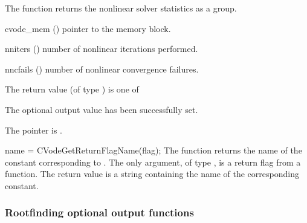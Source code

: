 {
  The function  returns the
  {\cvodes} nonlinear solver statistics as a group.
}
{
  \begin{args}
  \item[cvode\_mem] ()
    pointer to the {\cvodes} memory block.
  \item[nniters] ()
    number of nonlinear iterations performed.
  \item[nncfails] ()
    number of nonlinear convergence failures.
  \end{args}
}
{
  The return value  (of type ) is one of
  \begin{args}
  \item[\Id{CV\_SUCCESS}] 
    The optional output value has been successfully set.
  \item[\Id{CV\_MEM\_NULL}]
    The  pointer is .
  \end{args}
}
{}
{
  name = CVodeGetReturnFlagName(flag);
}
{
  The function  returns the
  name of the {\cvodes} constant corresponding to .
}
{
  The only argument, of type , is a return flag from a {\cvodes} function.
}
{
  The return value is a string containing the name of the corresponding constant.
}
{}


\subsubsection{Rootfinding optional output functions}\label{sss:optout_root}

